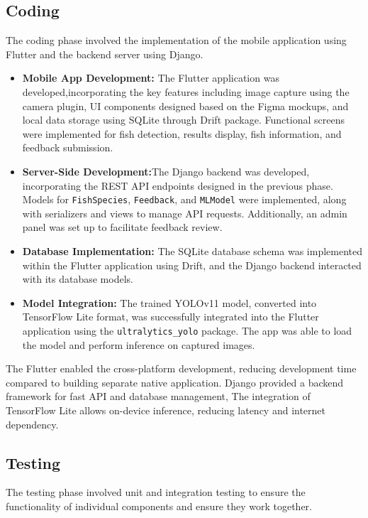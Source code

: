 \subsection{Coding}
The coding phase involved the implementation of the mobile application using Flutter and the backend server using Django.

\begin{itemize}
    \item\textbf{Mobile App Development:} The Flutter application was developed,incorporating the key features including image capture using the camera plugin, UI components designed based on the Figma mockups, and local data storage using SQLite through Drift package. Functional screens were implemented for fish detection, results display, fish information, and feedback submission.

    \item\textbf{Server-Side Development:}The Django backend was developed, incorporating the REST API endpoints designed in the previous phase. Models for \texttt{FishSpecies}, \texttt{Feedback}, and \texttt{MLModel} were implemented, along with serializers and views to manage API requests. Additionally, an admin panel was set up to facilitate feedback review.

    \item\textbf{Database Implementation:} The SQLite database schema was implemented within the Flutter application using Drift, and the Django backend interacted with its database models.

    \item\textbf{Model Integration:} The trained YOLOv11 model, converted into TensorFlow Lite format, was successfully integrated into the Flutter application using the \texttt{ultralytics\_yolo} package. The app was able to load the model and perform inference on captured images.
\end{itemize}


The Flutter enabled the cross-platform development, reducing development time compared to building separate native application. Django provided a backend framework for fast API and database management, The integration of TensorFlow Lite allows on-device inference, reducing latency and internet dependency. 


\subsection{Testing}
The testing phase involved unit and integration testing to ensure the functionality of individual components and ensure they work together.

